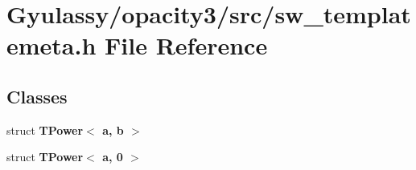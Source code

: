 \section{Gyulassy/opacity3/src/sw\_\-templatemeta.h File Reference}
\label{sw__templatemeta_8h}
\subsection*{Classes}
\begin{CompactItemize}
\item 
struct {\bf TPower$<$ a, b $>$}
\item 
struct {\bf TPower$<$ a, 0 $>$}
\end{CompactItemize}

